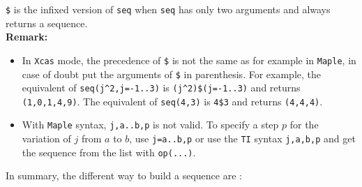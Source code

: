\documentclass[a4paper,11pt]{book}
\begin{document}
{\tt \$} is the infixed version of {\tt seq} when {\tt seq} has only two 
arguments and always returns a sequence.\\
{\bf Remark:} 
\begin{itemize}
\item In {\tt Xcas} mode, the precedence of {\tt \$} is not the same as
for example in {\tt Maple}, in case of doubt 
put the arguments of {\tt \$} in parenthesis.
For example, the equivalent of {\tt seq(j\verb|^|2,j=-1..3)} is
{\tt (j\verb|^|2)\$(j=-1..3)} and
returns {\tt (1,0,1,4,9)}. 
The equivalent of {\tt seq(4,3)} is {\tt 4\$3} and returns 
{\tt (4,4,4)}.
\item
With {\tt Maple} syntax, {\tt j,a..b,p} is not valid.
To specify a step $p$ for the variation of 
$j$ from $a$ to $b$, use {\tt j=a..b,p} or use the {\tt TI} syntax
{\tt j,a,b,p} and get the sequence from the list with {\tt op(...)}.
\end{itemize}
In summary, the different way to build a sequence are :
\end{document}
